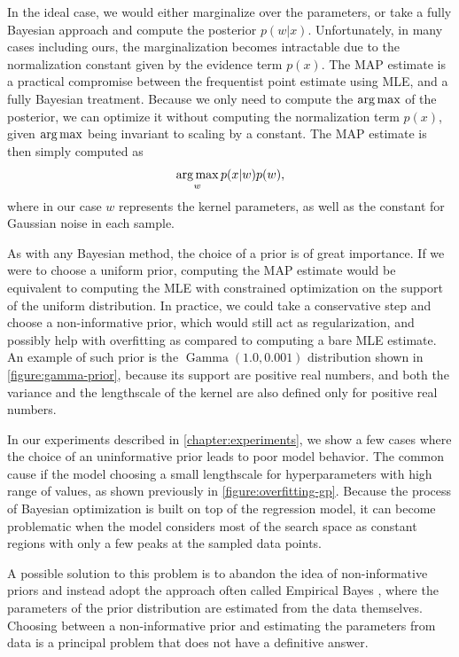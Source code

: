 In the ideal case, we would either marginalize over the parameters, or take a
fully Bayesian approach and compute the posterior $p(w | x)$. Unfortunately, in
many cases including ours, the marginalization becomes intractable due to the
normalization constant given by the evidence term $p(x)$. The MAP estimate is a
practical compromise between the frequentist point estimate using MLE, and a
fully Bayesian treatment. Because we only need to compute the $\operatorname*{arg\,max}$ of the
posterior, we can optimize it without computing the normalization term $p(x)$,
given $\operatorname*{arg\,max}$ being invariant to scaling by a constant. The MAP estimate is
then simply computed as $$ \operatorname*{arg\,max}_w p(x|w) p(w), $$ where in our case $w$
represents the kernel parameters, as well as the constant for Gaussian noise in
each sample.

As with any Bayesian method, the choice of a prior is of great importance. If
we were to choose a uniform prior, computing the MAP estimate would be
equivalent to computing the MLE with constrained optimization on the support of
the uniform distribution. In practice, we could take a conservative step and
choose a non-informative prior, which would still act as regularization, and
possibly help with overfitting as compared to computing a bare MLE estimate. An
example of such prior is the $\operatorname{Gamma}(1.0, 0.001)$ distribution
shown in \autoref{figure:gamma-prior}, because its support are positive real
numbers, and both the variance and the lengthscale of the kernel are also
defined only for positive real numbers.

In our experiments described in \autoref{chapter:experiments}, we show a few
cases where the choice of an uninformative prior leads to poor model behavior.
The common cause if the model choosing a small lengthscale for hyperparameters
with high range of values, as shown previously in
\autoref{figure:overfitting-gp}. Because the process of Bayesian optimization
is built on top of the regression model, it can become problematic when the
model considers most of the search space as constant regions with only a few
peaks at the sampled data points.

A possible solution to this problem is to abandon the idea of non-informative
priors and instead adopt the approach often called Empirical Bayes
\citep{murphy2012machine}, where the parameters of the prior distribution are
estimated from the data themselves. Choosing between a non-informative prior
and estimating the parameters from data is a principal problem that does not
have a definitive answer.


